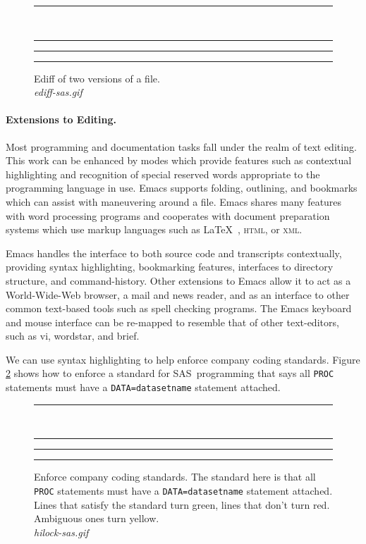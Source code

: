\documentclass{article}
\newcommand*{\SAS}{\textsc{SAS}}
\newcommand{\stexttt}[1]{{\small\texttt{#1}}}
\newcommand{\emptyfig}{
\hspace*{42pt}\rule{324pt}{.25pt}\\
\hspace*{42pt}\rule{.25pt}{10pc}
\rule{316pt}{.25pt}
\rule{.25pt}{10pc}}
\begin{document}
\begin{figure}
\emptyfig
\caption[place holder for a long caption]{Ediff of two versions of a file.\\
{\it ediff-sas.gif}
\label{f.ediff}}
\end{figure}





\paragraph{Extensions to Editing.}
Most programming and documentation tasks fall under the realm of text
editing.  This work can be enhanced by modes which provide features
such as contextual highlighting and recognition of special reserved
words appropriate to the programming language in use.  Emacs supports
folding, outlining, and bookmarks which can assist with maneuvering
around a file.  Emacs shares many features with word processing
programs and cooperates with document preparation systems which use
markup languages such as \LaTeX\ , \textsc{html}, or \textsc{xml}.


Emacs handles the interface to both source code and transcripts
contextually, providing syntax highlighting, bookmarking features,
interfaces to directory structure, and command-history.  Other
extensions to Emacs allow it to act as a World-Wide-Web browser, a
mail and news reader, and as an interface to other common text-based
tools such as spell checking programs.  The Emacs keyboard and mouse
interface can be re-mapped to resemble that of other text-editors,
such as vi, wordstar, and brief.

We can use syntax highlighting to help enforce company coding
standards.  Figure \ref{f.hilock} shows how to enforce a standard for
\SAS\ programming that says all \stexttt{PROC} statements must have a
\stexttt{DATA=datasetname} statement attached.

\begin{figure}
\emptyfig
\caption[place holder for a long caption]{Enforce company coding
standards.  The standard here is that all \stexttt{PROC} statements must have
a \stexttt{DATA=datasetname} statement attached.  Lines that satisfy the standard
turn green, lines that don't turn red.  Ambiguous ones turn yellow.\\
{\it hilock-sas.gif}
\label{f.hilock}}
\end{figure}
\end{document}
